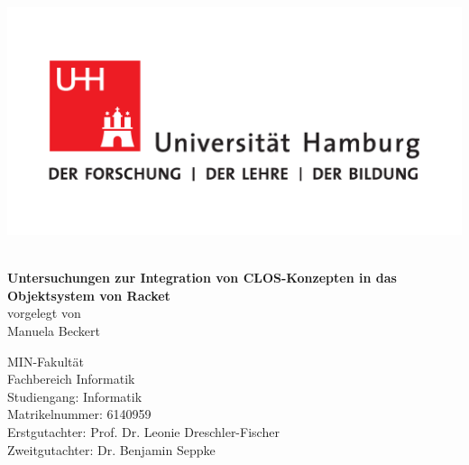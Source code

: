 \frontmatter
{}

\begin{titlepage}
\setcounter{page}{-1}
\includegraphics[scale=0.3]{pictures/logo.pdf}
\vspace*{2cm}
\Large
\begin{center} 
 {\color{uhhred}\textbf{}}
\vspace*{2.0cm}\\
{\LARGE \textbf{Untersuchungen zur Integration von CLOS-Konzepten in das Objektsystem von Racket}}
\vspace*{2.0cm}\\
vorgelegt von
\vspace*{0.4cm}\\
Manuela Beckert
\end{center}
\vspace*{3.9cm}

\noindent 
MIN-Fakultät \vspace*{0.4cm} \\ 
Fachbereich Informatik \vspace*{0.4cm} \\ 
Studiengang: Informatik \vspace*{0.4cm} \\ 
Matrikelnummer: 6140959 \vspace*{0.8cm} \\ 
Erstgutachter: Prof. Dr. Leonie Dreschler-Fischer \vspace*{0.4cm} \\ 
Zweitgutachter: Dr. Benjamin Seppke

\newpage 
\thispagestyle{empty}
\setcounter{page}{0}
~\\ \vfill \noindent 

\end{titlepage}

\restoregeometry
